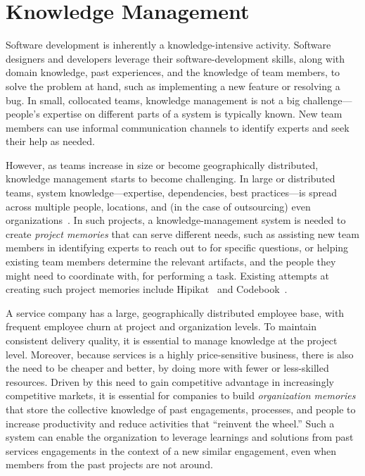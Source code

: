 
\section{Knowledge Management}
\label{sec:km}

Software development is inherently a knowledge-intensive activity. Software
designers and developers leverage their software-development skills, along with
domain knowledge, past experiences, and the knowledge of team members, to solve
the problem at hand, such as implementing a new feature or resolving a bug.  In
small, collocated teams, knowledge management is not a big challenge---people's
expertise on different parts of a system is typically known. New team members
can use informal communication channels to identify experts and seek their help
as needed.

However, as teams increase in size or become geographically distributed,
knowledge management starts to become challenging. In large or distributed
teams, system knowledge---\eg expertise, dependencies, best practices---is
spread across multiple people, locations, and (in the case of outsourcing) even
organizations~\cite{Desouza:2006}. In such projects, a knowledge-management
system is needed to create \textit{project memories} that can serve different
needs, such as assisting new team members in identifying experts to reach out to
for specific questions, or helping existing team members determine the relevant
artifacts, and the people they might need to coordinate with, for performing a
task. Existing attempts at creating such project memories include
Hipikat~\cite{Murphy:2005} and Codebook~\cite{Begel:2010}.


A service company has a large, geographically distributed employee base, with
frequent employee churn at project and organization levels. To maintain
consistent delivery quality, it is essential to manage knowledge at the project
level. Moreover, because services is a highly price-sensitive business, there is
also the need to be cheaper and better, by doing more with fewer or less-skilled
resources. Driven by this need to gain competitive advantage in increasingly
competitive markets, it is essential for companies to build \textit{organization
  memories} that store the collective knowledge of past engagements, processes,
and people to increase productivity and reduce activities that ``reinvent the
wheel.'' Such a system can enable the organization to leverage learnings and
solutions from past services engagements in the context of a new similar
engagement, even when members from the past projects are not around.


